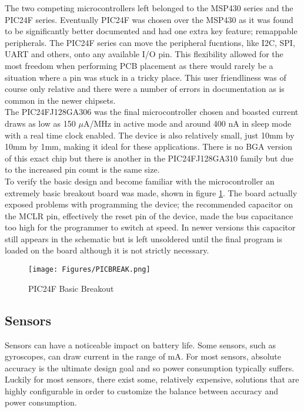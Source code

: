 \documentclass[12pt,openany,a4paper]{book}
\begin{document}
		The two competing microcontrollers left belonged to the MSP430 series and the PIC24F series. Eventually PIC24F was chosen over the MSP430 as it was found to be significantly better documented and had one extra key feature; remappable peripherals. The PIC24F series can move the peripheral fucntions, like I2C, SPI, UART and others, onto any available I/O pin. This flexibility allowed for the most freedom when performing PCB placement as there would rarely be a situation where a pin was stuck in a tricky place. This user friendliness was of course only relative and there were a number of errors in documentation as is common in the newer chipsets. \\
		
		The PIC24FJ128GA306 was the final microcontroller chosen \cite{PIC24} and boasted current draws as low as 150 $\mu$A/MHz in active mode and around 400 nA in sleep mode with a real time clock enabled. The device is also relatively small, just 10mm by 10mm by 1mm, making it ideal for these applications. There is no BGA version of this exact chip but there is another in the PIC24FJ128GA310 family but due to the increased pin count is the same size. \\
		
		To verify the basic design and become familiar with the microcontroller an extremely basic breakout board was made, shown in figure \ref{fig:PICBREAK}. The board actually exposed problems with programming the device; the recommended capacitor on the MCLR pin, effectively the reset pin of the device, made the bus capacitance too high for the programmer to switch at speed. In newer versions this capacitor still appears in the schematic but is left unsoldered until the final program is loaded on the board although it is not strictly necessary. \\
		
		\begin{figure}[H]
			\centering
			\texttt{[image: Figures/PICBREAK.png]}
			\caption{PIC24F Basic Breakout}
			\label{fig:PICBREAK}
		\end{figure}		
		
		\newpage
		\subsection{Sensors}
		Sensors can have a noticeable impact on battery life. Some sensors, such as gyroscopes, can draw current in the range of mA. For most sensors, absolute accuracy is the ultimate design goal and so power consumption typically suffers. Luckily for most sensors, there exist some, relatively expensive, solutions that are highly configurable in order to customize the balance between accuracy and power consumption. \\
		
\end{document}
